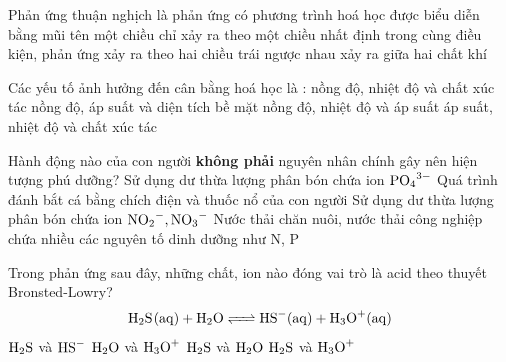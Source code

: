 \documentclass[11pt,a4paper]{article}
\begin{document}
\begin{ex}
Phản ứng thuận nghịch là phản ứng
\choice
{có phương trình hoá học được biểu diễn bằng mũi tên một chiều}
{chỉ xảy ra theo một chiều nhất định}
{\True trong cùng điều kiện, phản ứng xảy ra theo hai chiều trái ngược nhau}
{xảy ra giữa hai chất khí}

\end{ex}
\begin{ex}
Các yếu tố ảnh hưởng đến cân bằng hoá học là :
\choice
{nồng độ, nhiệt độ và chất xúc tác}
{nồng độ, áp suất và diện tích bề mặt}
{\True nồng độ, nhiệt độ và áp suất}
{áp suất, nhiệt độ và chất xúc tác}

\end{ex}
\begin{ex}
Hành động nào của con người \textbf{không phải} nguyên nhân chính gây nên hiện tượng phú dưỡng?
\choice
{Sử dụng dư thừa lượng phân bón chứa ion $\ce{PO4^3-}$}
{\True Quá trình đánh bắt cá bằng chích điện và thuốc nổ của con người}
{Sử dụng dư thừa lượng phân bón chứa ion $\ce{NO2^-}, \ce{NO3^-}$}
{Nước thải chăn nuôi, nước thải công nghiệp chứa nhiều các nguyên tố dinh dưỡng như N, P}

\end{ex}
\begin{ex}
Trong phản ứng sau đây, những chất, ion nào đóng vai trò là acid theo thuyết Bronsted-Lowry?
$$\ce{H2S(aq) + H2O <=> HS^-(aq) + H3O^+(aq)}$$
\choice
{$\ce{H2S}$ và $\ce{HS^-}$}
{$\ce{H2O}$ và $\ce{H3O^+}$}
{$\ce{H2S}$ và $\ce{H2O}$}
{\True $\ce{H2S}$ và $\ce{H3O^+}$}

\end{ex}
\end{document}
